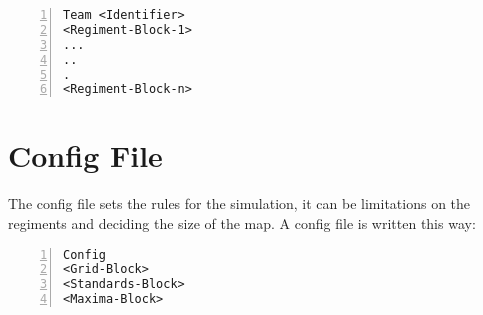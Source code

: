 		\begin{lstlisting}[basicstyle=\small\sffamily,
		keywordstyle={\color{blue}},
		comment={[l]{//}}, morecomment={[s]{/*}{*/}}, commentstyle=\itshape,
		columns={[l]flexible}, numbers=left, numberstyle=\tiny,
		frameround=fftt, frame=shadowbox, captionpos=b,
		caption={Regiment Assignment},
		label=RegimentAssignment]
Team <Identifier>
<Regiment-Block-1>
...
..
.
<Regiment-Block-n>
		\end{lstlisting}
	
\section{Config File}
\label{doc:cfgfile}
	The config file sets the rules for the simulation, it can be limitations on the regiments and deciding the size of the map.
	A config file is written this way: \\

		\begin{lstlisting}[basicstyle=\small\sffamily,
		keywordstyle={\color{blue}},
		comment={[l]{//}}, morecomment={[s]{/*}{*/}}, commentstyle=\itshape,
		columns={[l]flexible}, numbers=left, numberstyle=\tiny,
		frameround=fftt, frame=shadowbox, captionpos=b,
		caption={Config file}]
Config
<Grid-Block>
<Standards-Block>
<Maxima-Block>
		\end{lstlisting}
	
